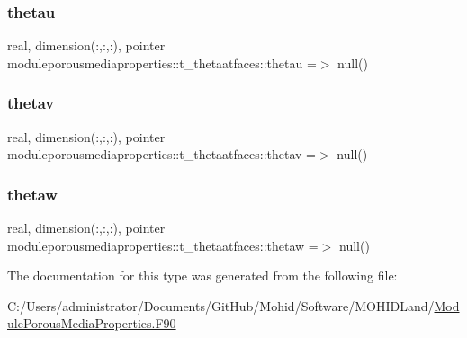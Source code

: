\subsubsection{\texorpdfstring{thetau}{thetau}}
{\footnotesize\ttfamily real, dimension(\+:,\+:,\+:), pointer moduleporousmediaproperties\+::t\+\_\+thetaatfaces\+::thetau =$>$ null()\hspace{0.3cm}{\ttfamily [private]}}

\mbox{\label{structmoduleporousmediaproperties_1_1t__thetaatfaces_a95b5d7ec0ac5c5da185c11e5b0ba796c}} 
\subsubsection{\texorpdfstring{thetav}{thetav}}
{\footnotesize\ttfamily real, dimension(\+:,\+:,\+:), pointer moduleporousmediaproperties\+::t\+\_\+thetaatfaces\+::thetav =$>$ null()\hspace{0.3cm}{\ttfamily [private]}}

\mbox{\label{structmoduleporousmediaproperties_1_1t__thetaatfaces_a634b6a0d77479a79d3dcd1a1caf28466}} 
\subsubsection{\texorpdfstring{thetaw}{thetaw}}
{\footnotesize\ttfamily real, dimension(\+:,\+:,\+:), pointer moduleporousmediaproperties\+::t\+\_\+thetaatfaces\+::thetaw =$>$ null()\hspace{0.3cm}{\ttfamily [private]}}



The documentation for this type was generated from the following file\+:\begin{DoxyCompactItemize}
\item 
C\+:/\+Users/administrator/\+Documents/\+Git\+Hub/\+Mohid/\+Software/\+M\+O\+H\+I\+D\+Land/\mbox{\hyperlink{_module_porous_media_properties_8_f90}{Module\+Porous\+Media\+Properties.\+F90}}\end{DoxyCompactItemize}
